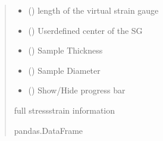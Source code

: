\documentclass[letterpaper,10pt,english]{sphinxmanual}
\begin{document}
\begin{fulllineitems}
\begin{fulllineitems}
\begin{quote}
\begin{description}
\begin{itemize}
\item {} 
\sphinxAtStartPar
{} () \textendash{} length of the virtual strain gauge

\item {} 
\sphinxAtStartPar
{} (\sphinxstyleliteralemphasis{\sphinxupquote{{[}}}\sphinxstyleliteralemphasis{\sphinxupquote{, }}\sphinxstyleliteralemphasis{\sphinxupquote{, }}\sphinxstyleliteralemphasis{\sphinxupquote{{]}}}) \textendash{} User\sphinxhyphen{}defined center of the SG

\item {} 
\sphinxAtStartPar
{} () \textendash{} Sample Thickness

\item {} 
\sphinxAtStartPar
{} () \textendash{} Sample Diameter

\item {} 
\sphinxAtStartPar
{} () \textendash{} Show/Hide progress bar

\end{itemize}

\sphinxAtStartPar
full stress\sphinxhyphen{}strain information

\sphinxAtStartPar
pandas.DataFrame


\end{description}
\end{quote}
\end{fulllineitems}
\end{fulllineitems}
\end{document}
